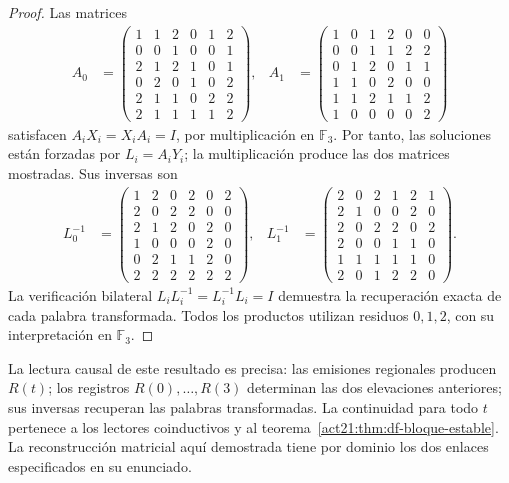 \begin{proof}
Las matrices
\begin{align*}
 A_0&=\begin{pmatrix}
1&1&2&0&1&2\\0&0&1&0&0&1\\2&1&2&1&0&1\\
0&2&0&1&0&2\\2&1&1&0&2&2\\2&1&1&1&1&2
\end{pmatrix},&
 A_1&=\begin{pmatrix}
1&0&1&2&0&0\\0&0&1&1&2&2\\0&1&2&0&1&1\\
1&1&0&2&0&0\\1&1&2&1&1&2\\1&0&0&0&0&2
\end{pmatrix}
\end{align*}
satisfacen \(A_iX_i=X_iA_i=I\), por multiplicación en \(\mathbb F_3\).
Por tanto, las soluciones están forzadas por \(L_i=A_iY_i\); la
multiplicación produce las dos matrices mostradas. Sus inversas son
\begin{align*}
 L_0^{-1}&=\begin{pmatrix}
1&2&0&2&0&2\\2&0&2&2&0&0\\2&1&2&0&2&0\\
1&0&0&0&2&0\\0&2&1&1&2&0\\2&2&2&2&2&2
\end{pmatrix},&
 L_1^{-1}&=\begin{pmatrix}
2&0&2&1&2&1\\2&1&0&0&2&0\\2&0&2&2&0&2\\
2&0&0&1&1&0\\1&1&1&1&1&0\\2&0&1&2&2&0
\end{pmatrix}.
\end{align*}
La verificación bilateral \(L_iL_i^{-1}=L_i^{-1}L_i=I\) demuestra la
recuperación exacta de cada palabra transformada. Todos los productos
utilizan residuos \(0,1,2\), con su interpretación en \(\mathbb F_3\).
\end{proof}

La lectura causal de este resultado es precisa: las emisiones regionales
producen \(R(t)\); los registros \(R(0),\ldots,R(3)\) determinan las dos
elevaciones anteriores; sus inversas recuperan las palabras transformadas.
La continuidad para todo \(t\) pertenece a los lectores coinductivos y al
teorema~\ref{act21:thm:df-bloque-estable}. La reconstrucción matricial aquí
demostrada tiene por dominio los dos enlaces especificados en su enunciado.

